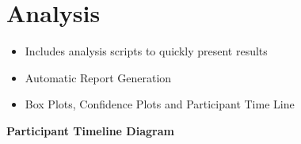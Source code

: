 \vspace{-0.8cm}

{\color{emphasisered} \section{Analysis}}


\normalsize

\begin{itemize}%
	\item Includes analysis scripts to quickly present results
	\item Automatic Report Generation
	\item Box Plots, Confidence Plots and Participant Time Line
\end{itemize}
\vspace{-1cm}

\begin{center}
\small
\textbf{Participant Timeline Diagram}
\end{center}

\vspace{-0.3cm}
